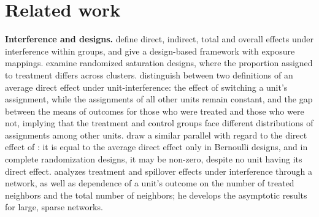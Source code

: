 \documentclass[11pt]{article}
\begin{document}
\section{Related work}
\textbf{Interference and designs.} \citet{hudgens2008} define direct, indirect, total and overall effects under interference within groups, and \citet{aronow2017} give a design-based framework with exposure mappings. \citet{baird2018} examine randomized saturation designs, where the proportion assigned to treatment differs across clusters. \citet{savje2021} distinguish between two definitions of an average direct effect under unit-interference: the effect of switching a unit's assignment, while the assignments of all other units remain constant, and the gap between the means of outcomes for those who were treated and those who were not, implying that the treatment and control groups face different distributions of assignments among other units. \citet{hu2022} draw a similar parallel with regard to the direct effect of \citet{hudgens2008}: it is equal to the average direct effect only in Bernoulli designs, and in complete randomization designs, it may be non-zero, despite no unit having its direct effect. \citet{leung2020} analyzes treatment and spillover effects under interference through a network, as well as dependence of a unit's outcome on the number of treated neighbors and the total number of neighbors; he develops the asymptotic results for large, sparse networks.
\end{document}
